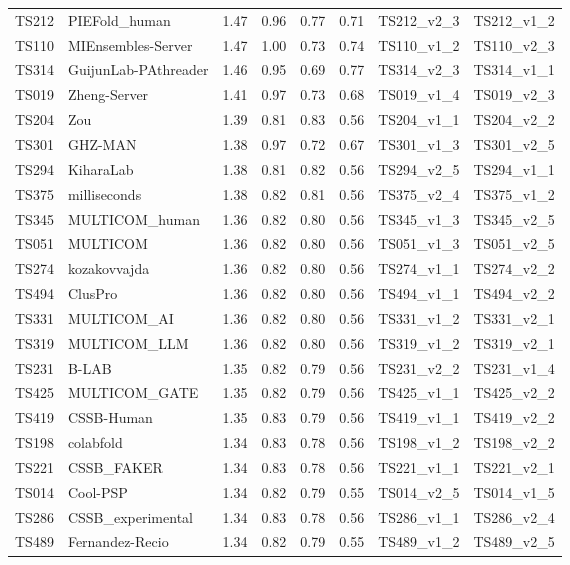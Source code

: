 \begin{longtable}{llllllll}
TS212 & PIEFold\_human & 1.47 & 0.96 & 0.77 & 0.71 & TS212\_v2\_3 & TS212\_v1\_2 \\ 
TS110 & MIEnsembles-Server & 1.47 & 1.00 & 0.73 & 0.74 & TS110\_v1\_2 & TS110\_v2\_3 \\ 
TS314 & GuijunLab-PAthreader & 1.46 & 0.95 & 0.69 & 0.77 & TS314\_v2\_3 & TS314\_v1\_1 \\ 
TS019 & Zheng-Server & 1.41 & 0.97 & 0.73 & 0.68 & TS019\_v1\_4 & TS019\_v2\_3 \\ 
TS204 & Zou & 1.39 & 0.81 & 0.83 & 0.56 & TS204\_v1\_1 & TS204\_v2\_2 \\ 
TS301 & GHZ-MAN & 1.38 & 0.97 & 0.72 & 0.67 & TS301\_v1\_3 & TS301\_v2\_5 \\ 
TS294 & KiharaLab & 1.38 & 0.81 & 0.82 & 0.56 & TS294\_v2\_5 & TS294\_v1\_1 \\ 
TS375 & milliseconds & 1.38 & 0.82 & 0.81 & 0.56 & TS375\_v2\_4 & TS375\_v1\_2 \\ 
TS345 & MULTICOM\_human & 1.36 & 0.82 & 0.80 & 0.56 & TS345\_v1\_3 & TS345\_v2\_5 \\ 
TS051 & MULTICOM & 1.36 & 0.82 & 0.80 & 0.56 & TS051\_v1\_3 & TS051\_v2\_5 \\ 
TS274 & kozakovvajda & 1.36 & 0.82 & 0.80 & 0.56 & TS274\_v1\_1 & TS274\_v2\_2 \\ 
TS494 & ClusPro & 1.36 & 0.82 & 0.80 & 0.56 & TS494\_v1\_1 & TS494\_v2\_2 \\ 
TS331 & MULTICOM\_AI & 1.36 & 0.82 & 0.80 & 0.56 & TS331\_v1\_2 & TS331\_v2\_1 \\ 
TS319 & MULTICOM\_LLM & 1.36 & 0.82 & 0.80 & 0.56 & TS319\_v1\_2 & TS319\_v2\_1 \\ 
TS231 & B-LAB & 1.35 & 0.82 & 0.79 & 0.56 & TS231\_v2\_2 & TS231\_v1\_4 \\ 
TS425 & MULTICOM\_GATE & 1.35 & 0.82 & 0.79 & 0.56 & TS425\_v1\_1 & TS425\_v2\_2 \\ 
TS419 & CSSB-Human & 1.35 & 0.83 & 0.79 & 0.56 & TS419\_v1\_1 & TS419\_v2\_2 \\ 
TS198 & colabfold & 1.34 & 0.83 & 0.78 & 0.56 & TS198\_v1\_2 & TS198\_v2\_2 \\ 
TS221 & CSSB\_FAKER & 1.34 & 0.83 & 0.78 & 0.56 & TS221\_v1\_1 & TS221\_v2\_1 \\ 
TS014 & Cool-PSP & 1.34 & 0.82 & 0.79 & 0.55 & TS014\_v2\_5 & TS014\_v1\_5 \\ 
TS286 & CSSB\_experimental & 1.34 & 0.83 & 0.78 & 0.56 & TS286\_v1\_1 & TS286\_v2\_4 \\ 
TS489 & Fernandez-Recio & 1.34 & 0.82 & 0.79 & 0.55 & TS489\_v1\_2 & TS489\_v2\_5 \\ 

\end{longtable}
